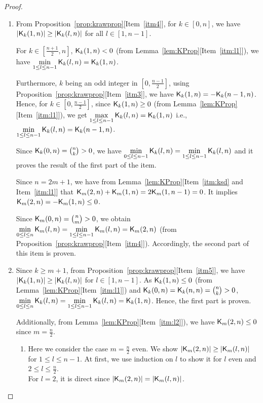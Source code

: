 \documentclass{llncs}
\begin{document}
\begin{proof}
\begin{enumerate}
\item 
From Proposition~\ref{prop:krawprop}[Item~\ref{itm4}], for $k \in [0,n]$,  we have $|\mathsf{K}_{k}(1,n)| \geq |\mathsf{K}_{k}(l,n)|$ for all $l \in [1, n-1]$.

For $k \in [\frac{n+1}{2}, n]$, $\mathsf{K}_{k}(1,n) < 0$ (from Lemma~\ref{lem:KProp}[Item~\ref{itm:l1}]), we have $\min\limits_{1 \leq l \leq n-1 }\mathsf{K}_{k}(l,n) = \mathsf{K}_{k}(1,n)$. 

Furthermore, $k$ being an odd integer in $[0,\frac{n-1}{2}]$, using Proposition~\ref{prop:krawprop}[Item~\ref{itm3}], we have $\mathsf{K}_{k}(1,n) = - \mathsf{K}_{k}(n-1,n)$.
Hence, for $k \in [0,\frac{n-1}{2}]$, since $\mathsf{K}_{k}(1,n) \geq 0$ (from Lemma~\ref{lem:KProp}[Item~\ref{itm:l1}]), we get $\max\limits_{1 \leq l \leq n-1 }\mathsf{K}_{k}(l,n) = \mathsf{K}_{k}(1,n)$ i.e., $\min\limits_{1 \leq l \leq n-1 }\mathsf{K}_{k}(l,n) = \mathsf{K}_{k}(n-1,n)$.

Since $\mathsf{K}_{k}(0,n) = {n \choose k} > 0$, we have $\min\limits_{0 \leq l \leq n-1 }\mathsf{K}_{k}(l,n) = \min\limits_{1 \leq l \leq n-1 }\mathsf{K}_{k}(l,n)$ and it proves the result of the first part of the item.

Since $n = 2m+1$, we have from Lemma~\ref{lem:KProp}[Item~\ref{itm:ksd} and Item~\ref{itm:l1}] that $\mathsf{K}_{m}(2,n)+\mathsf{K}_{m}(1,n) = 2\mathsf{K}_{m}(1,n-1) = 0$. 
It implies $\mathsf{K}_{m}(2,n) = -\mathsf{K}_{m}(1,n) \leq 0$.

Since $\mathsf{K}_{m}(0,n) = {n \choose m} > 0$, we obtain $\min\limits_{0 \leq l \leq n }\mathsf{K}_{m}(l,n) = \min\limits_{1 \leq l \leq n-1 }\mathsf{K}_{m}(l,n) = \mathsf{K}_{m}(2,n)$ (from Proposition~\ref{prop:krawprop}[Item~\ref{itm4}]). Accordingly, the second part of this item is proven.

\item Since $k \geq m+1$, from Proposition~\ref{prop:krawprop}[Item~\ref{itm5}], we have $|\mathsf{K}_{k}(1,n)| \geq |\mathsf{K}_{k}(l,n)|$ for $l \in [1,n-1]$. 
As $\mathsf{K}_{k}(1,n) \leq 0$ (from Lemma~\ref{lem:KProp}[Item~\ref{itm:l1}]) and $\mathsf{K}_{k}(0,n) = \mathsf{K}_{k}(n,n) = {n \choose k} > 0$, $\min\limits_{0 \leq l \leq n }\mathsf{K}_{k}(l,n) = \min\limits_{1 \leq l \leq n-1 }\mathsf{K}_{k}(l,n) = \mathsf{K}_{k}(1,n)$. Hence, the first part is proven.

Additionally, from Lemma~\ref{lem:KProp}[Item~\ref{itm:l2}]), we have 
$\mathsf{K}_{m}(2,n) \leq 0$ since $m = \frac{n}{2}$.

\begin{enumerate}
\item Here we consider the case $m = \frac{n}{2}$ even. We show $|\mathsf{K}_{m}(2,n)| \geq |\mathsf{K}_{m}(l,n)|$ for $1 \leq l \leq n-1$. At first, we use induction on $l$ to show it for $l$ even and $2 \leq l \leq \frac{n}{2}$.\\
For $l = 2$, it is direct since $|\mathsf{K}_{m}(2,n)| = |\mathsf{K}_{m}(l,n)|$.


\end{enumerate}
\end{enumerate}
\end{proof}
\end{document}
